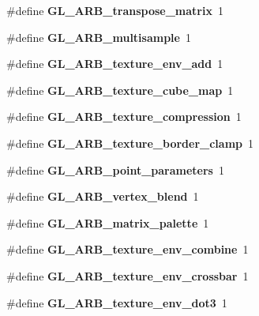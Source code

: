 \begin{DoxyCompactItemize}
\item 
\#define {\bfseries G\+L\+\_\+\+A\+R\+B\+\_\+transpose\+\_\+matrix}~1\label{_s_d_l__opengl_8h_abf78eee62efb219bc0482d423513f4da}

\item 
\#define {\bfseries G\+L\+\_\+\+A\+R\+B\+\_\+multisample}~1\label{_s_d_l__opengl_8h_ac15c9cb6992279f713d6c4384c6be874}

\item 
\#define {\bfseries G\+L\+\_\+\+A\+R\+B\+\_\+texture\+\_\+env\+\_\+add}~1\label{_s_d_l__opengl_8h_a6f7f28eee83a4d9a91bffbe037dfbc63}

\item 
\#define {\bfseries G\+L\+\_\+\+A\+R\+B\+\_\+texture\+\_\+cube\+\_\+map}~1\label{_s_d_l__opengl_8h_ae0d3bb7d2950d412da935431ac4f3af8}

\item 
\#define {\bfseries G\+L\+\_\+\+A\+R\+B\+\_\+texture\+\_\+compression}~1\label{_s_d_l__opengl_8h_a4ac5d2be61886b6fea6c113a1d60faf8}

\item 
\#define {\bfseries G\+L\+\_\+\+A\+R\+B\+\_\+texture\+\_\+border\+\_\+clamp}~1\label{_s_d_l__opengl_8h_a8fb554c539dcbc4c233693443480cea2}

\item 
\#define {\bfseries G\+L\+\_\+\+A\+R\+B\+\_\+point\+\_\+parameters}~1\label{_s_d_l__opengl_8h_a9cf12ee14c00a9809a33576387d86e62}

\item 
\#define {\bfseries G\+L\+\_\+\+A\+R\+B\+\_\+vertex\+\_\+blend}~1\label{_s_d_l__opengl_8h_a006ef5956937df7cdac5b5ec22e5ec66}

\item 
\#define {\bfseries G\+L\+\_\+\+A\+R\+B\+\_\+matrix\+\_\+palette}~1\label{_s_d_l__opengl_8h_a1c6d5bc4735aec73692aabe13db4aaa5}

\item 
\#define {\bfseries G\+L\+\_\+\+A\+R\+B\+\_\+texture\+\_\+env\+\_\+combine}~1\label{_s_d_l__opengl_8h_a0ee8255b797184209d48b8761b6765b9}

\item 
\#define {\bfseries G\+L\+\_\+\+A\+R\+B\+\_\+texture\+\_\+env\+\_\+crossbar}~1\label{_s_d_l__opengl_8h_ae91e790f2cbb2f4fb96f53a6cf7f9e4b}

\item 
\#define {\bfseries G\+L\+\_\+\+A\+R\+B\+\_\+texture\+\_\+env\+\_\+dot3}~1\label{_s_d_l__opengl_8h_af9abd4bf01d7f384ad68c3c12021c8a6}


\end{DoxyCompactItemize}
